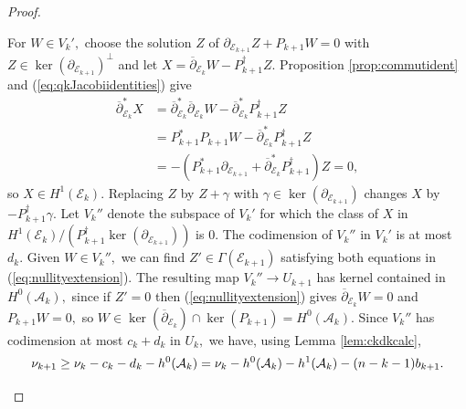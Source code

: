 \documentclass[10pt,a4paper]{amsart}
\newcommand{\delbar}{\overline{\partial}}
\newcommand{\del}{\partial}
\begin{document}
\begin{proof}
\begin{enumerate}[label=(\alph*)]
        For $W \in V_{k}',$ choose the solution $Z$ of $\del_{\mathcal{E}_{k+1}} Z + P_{k+1} W = 0$ with $Z \in \ker (\partial_{\mathcal E_{k+1}})^\perp$ and let $X = \delbar_{\mathcal{E}_{k}} W - P^\dagger_{k+1} Z.$ Proposition \ref{prop:commutident} and (\ref{eq:qkJacobiidentities}) give
        \begin{equation*}
            \begin{aligned}
                \delbar_{\mathcal{E}_k}^* X &= \delbar_{\mathcal{E}_k}^* \delbar_{\mathcal{E}_{k}} W - \delbar_{\mathcal{E}_k}^* P^\dagger_{k+1} Z \\
                &= P_{k+1}^* P_{k+1} W - \delbar_{\mathcal{E}_k}^* P^\dagger_{k+1} Z \\
                &= -\left( P_{k+1}^* \del_{\mathcal{E}_{k+1}} +  \delbar_{\mathcal{E}_k}^* P^\dagger_{k+1} \right) Z = 0,
            \end{aligned}
        \end{equation*}
        so $X \in H^1(\mathcal{E}_k).$ Replacing $Z$ by $Z + \gamma$ with $\gamma \in \ker (\partial_{\mathcal E_{k+1}})$ changes $X$ by $-P_{k+1}^\dagger \gamma.$ Let $V_{k}''$ denote the subspace of $V_k'$ for which the class of $X$ in ${H^1(\mathcal{E}_{k})}/({P^\dagger_{k+1} \ker(\del_{\mathcal{E}_{k+1}})})$ is $0.$ The codimension of $V_{k}''$ in $V_k'$ is at most $d_k.$ Given $W \in V_{k}'',$ we can find $Z' \in \Gamma(\mathcal{E}_{k+1})$ satisfying both equations in (\ref{eq:nullityextension}). The resulting map $V_{k}'' \to U_{k+1}$ has kernel contained in $H^0(\mathcal{A}_k),$ since if $Z' = 0$ then (\ref{eq:nullityextension}) gives $\delbar_{\mathcal{E}_k} W = 0$ and $P_{k+1} W = 0,$ so $W \in \ker(\delbar_{\mathcal{E}_k}) \cap \ker(P_{k+1}) = H^0(\mathcal{A}_k).$ Since $V_k''$ has codimension at most $c_k+d_k$ in $U_k,$ we have, using Lemma \ref{lem:ckdkcalc},
        \begin{equation*}
            \nu_{k+1} \geq \nu_k - c_k - d_k - h^0(\mathcal{A}_k) = \nu_k -h^0(\mathcal{A}_k) - h^1(\mathcal{A}_k) - (n-k-1)b_{k+1}.\qedhere
        \end{equation*}
    \end{enumerate}
\end{proof}
\end{document}

